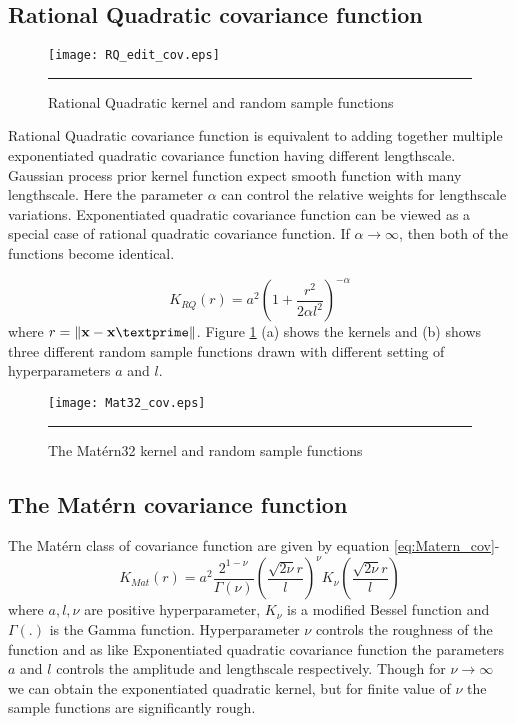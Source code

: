\subsection{Rational Quadratic covariance function}
\begin{figure}
	\centering
		\texttt{[image: RQ\_edit\_cov.eps]}
		\rule{35em}{0.5pt}
	\caption[Rational Quadratic kernel and random sample functions]
		{Rational Quadratic kernel and random sample functions}
	\label{fig:Rational_Quadratic_covariance}
\end{figure}
Rational Quadratic covariance function is equivalent to adding together multiple exponentiated quadratic covariance function having different lengthscale. Gaussian process prior kernel function expect smooth function with many lengthscale. Here the parameter $\alpha$ can control the relative weights for lengthscale variations. Exponentiated quadratic covariance function can be viewed as a special case of rational quadratic covariance function. If $\alpha \to \infty$, then both of the functions become identical.

\begin{equation} \label{eq:RQ_cov}
K_{RQ}(r)= a^2 \left(1+ \frac{r^2}{2 \alpha l^2}\right)^{-\alpha}
\end{equation}
where $r=\lVert \textbf{x}-\textbf{x}\textprime \rVert$. Figure \ref{fig:Rational_Quadratic_covariance} (a) shows the kernels and (b) shows three different random sample functions drawn with different setting of hyperparameters $a$ and $l$.

\begin{figure}[t]
	\centering
		\texttt{[image: Mat32\_cov.eps]}
		\rule{35em}{0.5pt}
	\caption[The Mat{\'e}rn32 kernel and random sample functions]
		{The Mat{\'e}rn32 kernel and random sample functions}
	\label{fig:Matern32_covariance}
\end{figure}


\subsection{The Mat{\'e}rn covariance function}
The Mat{\'e}rn class of covariance function are given by equation \ref{eq:Matern_cov}-
\begin{equation} \label{eq:Matern_cov}
K_{Mat}(r)= a^2\frac{2^{1-\nu}}{\Gamma(\nu)}\left(\frac{\sqrt{2\nu}r}{l}\right)^\nu K_{\nu}
	  \left(\frac{\sqrt{2\nu}r}{l}\right)
\end{equation}
where $a, l, \nu$ are positive hyperparameter, $K_{\nu}$ is a modified Bessel function and $\Gamma \left(.\right)$ is the Gamma function. Hyperparameter $\nu$ controls the roughness of the function and as like Exponentiated quadratic covariance function the parameters $a$ and $l$ controls the amplitude and lengthscale respectively. Though for $\nu \to \infty$ we can obtain the exponentiated quadratic kernel, but for finite value of $\nu$ the sample functions are significantly rough. 

